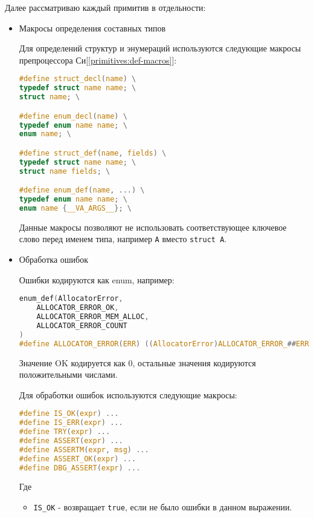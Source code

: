 Далее рассматриваю каждый примитив в отдельности:
\begin{itemize}
\item Макросы определения составных типов

Для определений структур и энумераций используются следующие макросы препроцессора Си[\ref{primitives:def-macros}]:
\begin{lstlisting}[language=c, caption={Макросы определения составных типов}, label={primitives:def-macros}]
#define struct_decl(name) \
typedef struct name name; \
struct name; \

#define enum_decl(name) \
typedef enum name name; \
enum name; \

#define struct_def(name, fields) \
typedef struct name name; \
struct name fields; \

#define enum_def(name, ...) \
typedef enum name name; \
enum name {__VA_ARGS__}; \
\end{lstlisting} 

Данные макросы позволяют не использовать соответствующее ключевое слово перед именем типа, 
например \verb|A| вместо \verb|struct A|.

\item Обработка ошибок


Ошибки кодируются как enum, например:

\begin{lstlisting}[language=c, caption={Ошибки Аллокатора}, label={primitives:error-enum-ex}]
enum_def(AllocatorError,
    ALLOCATOR_ERROR_OK,
    ALLOCATOR_ERROR_MEM_ALLOC,
    ALLOCATOR_ERROR_COUNT
)
#define ALLOCATOR_ERROR(ERR) ((AllocatorError)ALLOCATOR_ERROR_##ERR)
\end{lstlisting}

Значение OK кодируется как 0, остальные значения кодируются положительными числами.

Для обработки ошибок используются следующие макросы:
\begin{lstlisting}[language=c, caption={Макросы обработки ошибок}, label={primitives:error-macros}]
#define IS_OK(expr) ...
#define IS_ERR(expr) ...
#define TRY(expr) ...
#define ASSERT(expr) ...
#define ASSERTM(expr, msg) ...
#define ASSERT_OK(expr) ...
#define DBG_ASSERT(expr) ...
\end{lstlisting}

Где
\begin{itemize}
    \item \verb|IS_OK| - возвращает \verb|true|, если не было ошибки в данном выражении.


\end{itemize}
\end{itemize}
